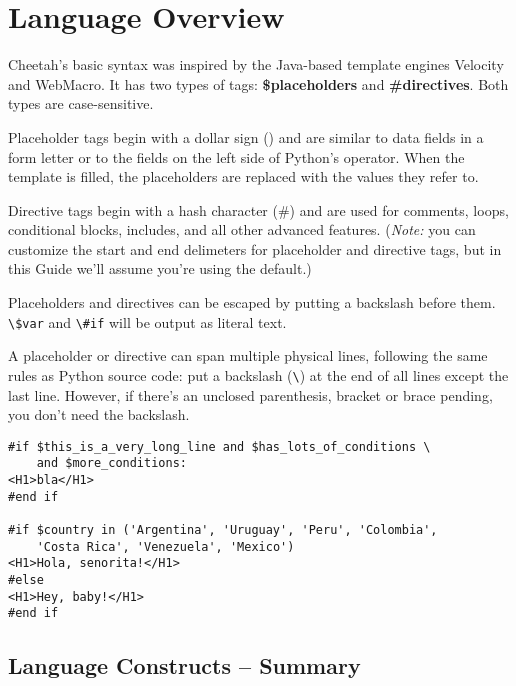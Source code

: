 \section{Language Overview}
\label{language}

Cheetah's basic syntax was inspired by the Java-based template engines Velocity
and WebMacro. It has two types of tags: {\bf \$placeholders} and {\bf
\#directives}.  Both types are case-sensitive.  

Placeholder tags begin with a dollar sign () and are similar to
data fields in a form letter or to the  fields on the left side
of Python's \code{\%} operator. When the template is filled, the placeholders
are replaced with the values they refer to.

Directive tags begin with a hash character (\#) and are used for comments,
loops, conditional blocks, includes, and all other advanced features.  
({\em Note:} you can customize the start and end delimeters for placeholder 
and directive tags, but in this Guide we'll assume you're using the default.)

Placeholders and directives can be escaped by putting a backslash before them.
\verb+\$var+ and \verb+\#if+ will be output as literal text.

A placeholder or directive can span multiple physical lines, following the same
rules as Python source code: put a backslash (\verb+\+) at the end of all
lines except the last line.  However, if there's an unclosed parenthesis,
bracket or brace pending, you don't need the backslash.

\begin{verbatim}
#if $this_is_a_very_long_line and $has_lots_of_conditions \
    and $more_conditions:
<H1>bla</H1>
#end if

#if $country in ('Argentina', 'Uruguay', 'Peru', 'Colombia',
    'Costa Rica', 'Venezuela', 'Mexico')
<H1>Hola, senorita!</H1>
#else
<H1>Hey, baby!</H1>
#end if
\end{verbatim}

\subsection{Language Constructs -- Summary}
\label{language.constructs}

